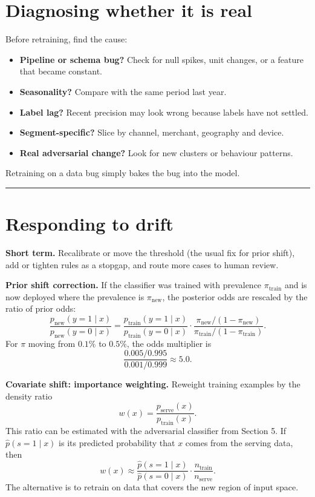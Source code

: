 \documentclass[11pt]{article}
\begin{document}
\section{Diagnosing whether it is real}

Before retraining, find the cause:
\begin{itemize}
    \item \textbf{Pipeline or schema bug?} Check for null spikes, unit changes, or a feature that became constant.
    \item \textbf{Seasonality?} Compare with the same period last year.
    \item \textbf{Label lag?} Recent precision may look wrong because labels have not settled.
    \item \textbf{Segment-specific?} Slice by channel, merchant, geography and device.
    \item \textbf{Real adversarial change?} Look for new clusters or behaviour patterns.
\end{itemize}

Retraining on a data bug simply bakes the bug into the model.

\vspace{5mm}
\hrule
\vspace{5mm}

\section{Responding to drift}

\textbf{Short term.} Recalibrate or move the threshold (the usual fix for prior shift), add or tighten rules as a stopgap, and route more cases to human review.

\textbf{Prior shift correction.} If the classifier was trained with prevalence \(\pi_{\text{train}}\) and is now deployed where the prevalence is \(\pi_{\text{new}}\), the posterior odds are rescaled by the ratio of prior odds:
\[
\frac{p_{\text{new}}(y=1\mid x)}{p_{\text{new}}(y=0\mid x)}
=
\frac{p_{\text{train}}(y=1\mid x)}{p_{\text{train}}(y=0\mid x)}
\cdot
\frac{\pi_{\text{new}}/(1-\pi_{\text{new}})}{\pi_{\text{train}}/(1-\pi_{\text{train}})}.
\]
For \(\pi\) moving from \(0.1\%\) to \(0.5\%\), the odds multiplier is
\[
\frac{0.005/0.995}{0.001/0.999}\approx 5.0.
\]

\textbf{Covariate shift: importance weighting.} Reweight training examples by the density ratio
\[
w(x)=\frac{p_{\text{serve}}(x)}{p_{\text{train}}(x)}.
\]
This ratio can be estimated with the adversarial classifier from Section 5. If \(\hat p(s=1\mid x)\) is its predicted probability that \(x\) comes from the serving data, then
\[
w(x)\approx\frac{\hat p(s=1\mid x)}{\hat p(s=0\mid x)}\cdot\frac{n_{\text{train}}}{n_{\text{serve}}}.
\]
The alternative is to retrain on data that covers the new region of input space.
\end{document}
